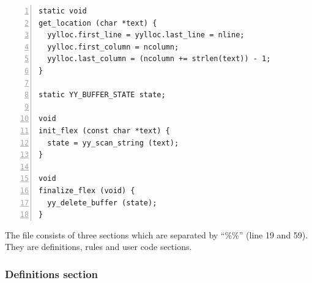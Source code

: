 \begin{lstlisting}[numbers=left]
static void
get_location (char *text) {
  yylloc.first_line = yylloc.last_line = nline;
  yylloc.first_column = ncolumn;
  yylloc.last_column = (ncolumn += strlen(text)) - 1;
}

static YY_BUFFER_STATE state;

void
init_flex (const char *text) {
  state = yy_scan_string (text);
}

void
finalize_flex (void) {
  yy_delete_buffer (state);
}
\end{lstlisting}

The file consists of three sections which are separated by ``\%\%''
(line 19 and 59). They are definitions, rules and user code sections.

\subsubsection{Definitions section}\label{definitions-section}


